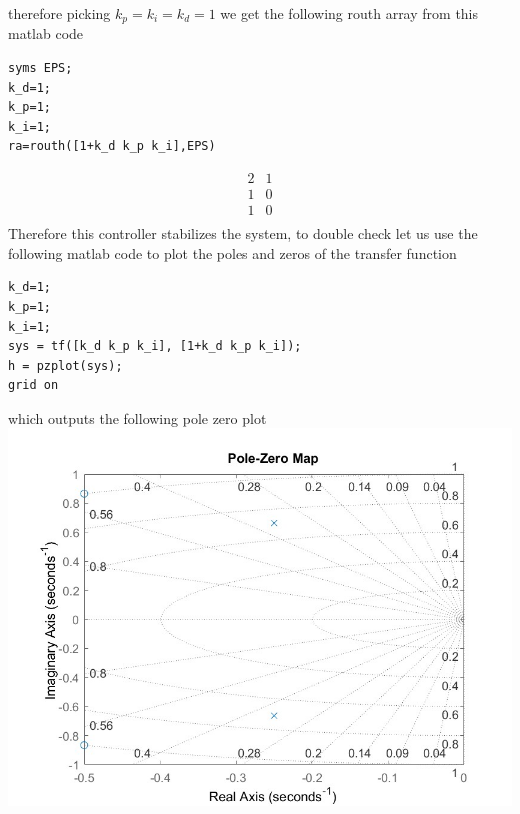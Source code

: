 \documentclass[12pt]{article}
\begin{document}
therefore picking $k_p=k_i=k_d=1$ we get the following routh array from this matlab code
\begin{verbatim}
syms EPS;
k_d=1;
k_p=1;
k_i=1;
ra=routh([1+k_d k_p k_i],EPS)
\end{verbatim}
$$\begin{matrix}
    2 & 1\\
    1 & 0\\
    1 & 0\\
\end{matrix}$$
Therefore this controller stabilizes the system, to double check let us use the following matlab code to plot the poles and zeros of the transfer function
\begin{verbatim}
k_d=1;
k_p=1;
k_i=1;
sys = tf([k_d k_p k_i], [1+k_d k_p k_i]);
h = pzplot(sys);
grid on
\end{verbatim}
which outputs the following pole zero plot\\
\includegraphics[scale=0.4]{Problem4Fig1.jpg}\\
\end{document}
